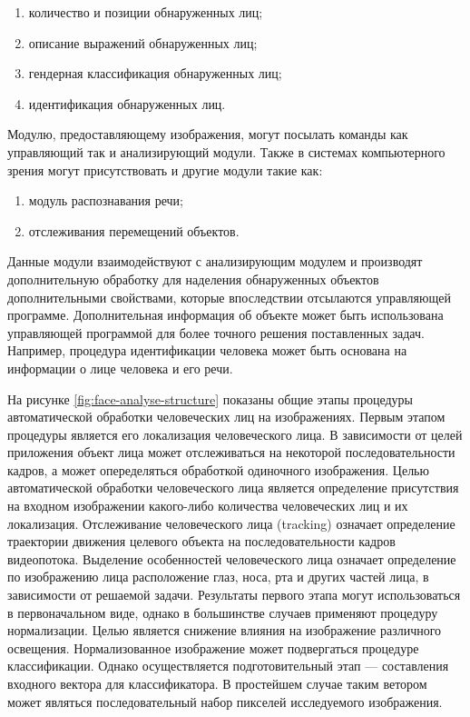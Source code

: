 \begin{enumerate}
  \item количество и позиции обнаруженных лиц;
  \item описание выражений обнаруженных лиц;
  \item гендерная классификация обнаруженных лиц;
  \item идентификация обнаруженных лиц.
\end{enumerate}


Модулю, предоставляющему изображения, могут посылать команды как управляющий так и анализирующий модули. Также в системах компьютерного зрения могут присутствовать и другие модули такие как:

\begin{enumerate}
  \item модуль распознавания речи;
  \item отслеживания перемещений объектов.
\end{enumerate}

Данные модули взаимодействуют с анализирующим модулем и производят дополнительную обработку для наделения обнаруженных объектов дополнительными свойствами, которые впоследствии отсылаются управляющей программе. Дополнительная информация об объекте может быть использована управляющей программой для более точного решения поставленных задач. Например, процедура идентификации человека может быть основана на информации о лице человека и его речи.





На рисунке \ref{fig:face-analyse-structure} показаны общие этапы процедуры автоматической обработки человеческих лиц на изображениях. Первым этапом процедуры является его локализация человеческого лица. В зависимости от целей приложения объект лица может отслеживаться на некоторой последовательности кадров, а может опеределяться обработкой одиночного изображения. Целью автоматической обработки человеческого лица является определение присутствия на входном изображении какого-либо количества человеческих лиц и их локализация. Отслеживание человеческого лица (tracking) означает определение траектории движения целевого объекта на последовательности кадров видеопотока. Выделение особенностей человеческого лица означает определение по изображению лица расположение глаз, носа, рта и других частей лица, в зависимости от решаемой задачи. Результаты первого этапа могут использоваться в первоначальном виде, однако в большинстве случаев применяют процедуру нормализации. Целью является снижение влияния на изображение различного освещения. Нормализованное изображение может подвергаться процедуре классификации. Однако осуществляется подготовительный этап --- составления входного вектора для классификатора. В простейшем случае таким ветором может являться последовательный набор пикселей исследуемого изображения.

